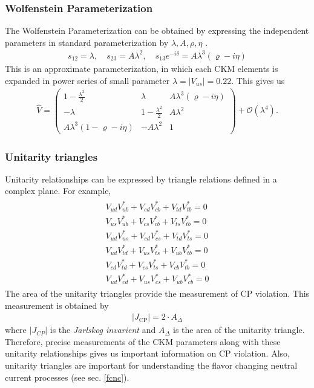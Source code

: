 \subsubsection{Wolfenstein Parameterization}
\vspace{-0.2cm}
The Wolfenstein Parameterization can be obtained by expressing the independent parameters in standard parameterization by $\lambda, A, \rho, \eta$ \cite{Buras:1994ec}.
\begin{eqnarray}
s_{12}=\lambda, \quad s_{23}=A \lambda^{2}, \quad s_{13} e^{-i \delta}=A \lambda^{3}(\varrho-i \eta)
\end{eqnarray}
This is an approximate parameterization, in which each CKM elements is expanded in power series of small parameter $\lambda = |V_{us}|=0.22$. This gives us 
\begin{eqnarray}
\hat{V}=\left(\begin{array}{ccc}{1-\frac{\lambda^{2}}{2}} & {\lambda} & {A \lambda^{3}(\varrho-i \eta)} \\ {-\lambda} & {1-\frac{\lambda^{2}}{2}} & {A \lambda^{2}} \\ {A \lambda^{3}(1-\varrho-i \eta)} & {-A \lambda^{2}} & {1}\end{array}\right)+\mathcal{O}\left(\lambda^{4}\right).
\end{eqnarray}
\subsubsection{Unitarity triangles}
\vspace{-0.2cm}
Unitarity relationships can be expressed by triangle relations defined in a complex plane. For example, 
\begin{eqnarray}
\begin{array}{l}{V_{u d} V_{u b}^{*}+V_{c d} V_{c b}^{*}+V_{t d} V_{t b}^{*}=0} \\ {V_{u  s} V_{u  b}^{*}+V_{c s} V_{c b}^{*}+V_{t s} V_{t b}^{*}=0} \\ {V_{u d } V_{u s}^{*}+V_{c d} V_{c s}^{*}+V_{t d} V_{t s}^{*}=0} \\ {V_{u d} V_{t d}^{*}+V_{u s} V_{t s}^{*}+V_{u b} V_{t b}^{*}=0} \\ {V_{c d} V_{t d}^{*}+V_{c s} V_{t s}^{*}+V_{c b} V_{t b}^{*}=0} \\ {V_{u d } V_{c d}^{*}+V_{u s} V_{c s}^{*}+V_{u b} V_{c b}^{*}=0}\end{array}
\end{eqnarray}
The area of the unitarity triangles provide the measurement of CP violation. This measurement is obtained by\cite{Jarlskog:1988ii} 
\begin{eqnarray}
\left|J_{\mathrm{CP}}\right|=2 \cdot A_{\Delta}
\end{eqnarray}
where $|J_{CP}|$ is the \textit{Jarlskog invarient} and $A_{\Delta}$ is the area of the unitarity triangle. Therefore, precise measurements of the CKM parameters along with these unitarity relationships gives us important information on CP violation. Also, unitarity triangles are important for understanding the flavor changing neutral current processes (see sec. \ref{fcnc}).

